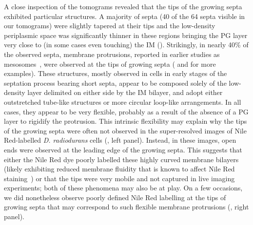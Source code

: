 A close inspection of the tomograms revealed that the tips of the growing septa exhibited particular structures.
A majority of septa (40 of the 64 septa visible in our tomograms) were slightly tapered at their tips and the low-density periplasmic space was significantly thinner in these regions bringing the PG layer very close to (in some cases even touching) the IM ().
Strikingly, in nearly 40\% of the observed septa, membrane protrusions, reported in earlier studies as mesosomes~\cite{thornleyFineStructureMicrococcus1965,sleytrStudyFreezeetchingFine1973}, were observed at the tips of growing septa ( and  for more examples).
These structures, mostly observed in cells in early stages of the septation process bearing short septa, appear to be composed solely of the low-density layer delimited on either side by the IM bilayer, and adopt either outstretched tube-like structures or more circular loop-like arrangements.
In all cases, they appear to be very flexible, probably as a result of the absence of a PG layer to rigidify the protrusion.
This intrinsic flexibility may explain why the tips of the growing septa were often not observed in the super-resolved images of Nile Red-labelled \textit{D. radiodurans} cells (, left panel).
Instead, in these images, open ends were observed at the leading edge of the growing septa.
This suggests that either the Nile Red dye poorly labelled these highly curved membrane bilayers (likely exhibiting reduced membrane fluidity that is known to affect Nile Red staining~\cite{strahlActinHomologueMreB2014}) or that the tips were very mobile and not captured in live imaging experiments; both of these phenomena may also be at play.
On a few occasions, we did nonetheless observe poorly defined Nile Red labelling at the tips of growing septa that may correspond to such flexible membrane protrusions (, right panel).

